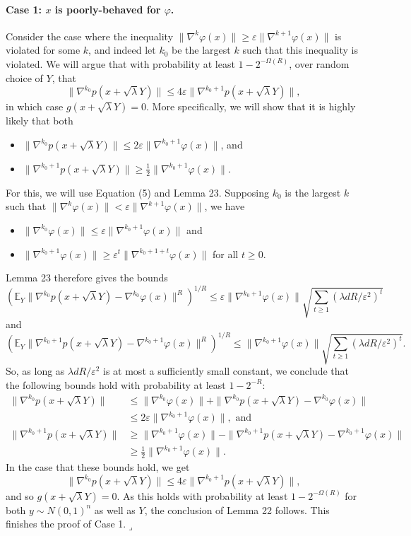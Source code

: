 \paragraph{Case 1: $x$ is poorly-behaved for $\varphi$.} Consider the case where the inequality $\|\nabla^k\varphi(x)\|\geq\varepsilon\|\nabla^{k+1}\varphi(x)\|$ is violated for some $k$, and indeed let $k_0$ be the largest $k$ such that this inequality is violated. We will argue that with probability at least $1-2^{-\Omega(R)}$, over random choice of $Y$, that
\[\|\nabla^{k_0}p(x+\sqrt\lambda Y)\|\leq4\varepsilon\|\nabla^{k_0+1}p(x+\sqrt\lambda Y)\|,\]
in which case $g(x+\sqrt\lambda Y)=0$.
More specifically, we will show that it is highly likely that both
\begin{itemize}
\item $\|\nabla^{k_0}p(x+\sqrt\lambda Y)\|\leq2\varepsilon\|\nabla^{k_0+1}\varphi(x)\|$, and
\item $\|\nabla^{k_0+1}p(x+\sqrt\lambda Y)\|\geq\frac12\|\nabla^{k_0+1}\varphi(x)\|$.
\end{itemize}
For this, we will use Equation (5) and Lemma 23. Supposing $k_0$ is the largest $k$ such that $\|\nabla^k\varphi(x)\|<\varepsilon\|\nabla^{k+1}\varphi(x)\|$, we have
\begin{itemize}
\item $\|\nabla^{k_0}\varphi(x)\|\leq\varepsilon\|\nabla^{k_0+1}\varphi(x)\|$ and
\item $\|\nabla^{k_0+1}\varphi(x)\|\geq\varepsilon^t\|\nabla^{k_0+1+t}\varphi(x)\|$ for all $t\geq0$.
\end{itemize}
Lemma 23 therefore gives the bounds
\[\left(\mathbb E_Y\|\nabla^{k_0}p(x+\sqrt\lambda Y)-\nabla^{k_0}\varphi(x)\|^R\right)^{1/R}\leq\varepsilon\|\nabla^{k_0+1}\varphi(x)\|\sqrt{\sum_{t\geq1}(\lambda dR/\varepsilon^2)^t}\]
and
\[\left(\mathbb E_Y\|\nabla^{k_0+1}p(x+\sqrt\lambda Y)-\nabla^{k_0+1}\varphi(x)\|^R\right)^{1/R}\leq\|\nabla^{k_0+1}\varphi(x)\|\sqrt{\sum_{t\geq1}(\lambda dR/\varepsilon^2)^t}.\]
So, as long as $\lambda dR/\varepsilon^2$ is at most a sufficiently small constant, we conclude that the following bounds hold with probability at least $1-2^{-R}$:
\begin{align*}
\|\nabla^{k_0}p(x+\sqrt\lambda Y)\|&\leq\|\nabla^{k_0}\varphi(x)\|+\|\nabla^{k_0}p(x+\sqrt\lambda Y)-\nabla^{k_0}\varphi(x)\|\\
&\leq2\varepsilon\|\nabla^{k_0+1}\varphi(x)\|,\text{ and}\\
\|\nabla^{k_0+1}p(x+\sqrt\lambda Y)\|&\geq\|\nabla^{k_0+1}\varphi(x)\|-\|\nabla^{k_0+1}p(x+\sqrt\lambda Y)-\nabla^{k_0+1}\varphi(x)\|\\
&\geq\tfrac12\|\nabla^{k_0+1}\varphi(x)\|.
\end{align*}
In the case that these bounds hold, we get
\[\|\nabla^{k_0}p(x+\sqrt\lambda Y)\|\leq4\varepsilon\|\nabla^{k_0+1}p(x+\sqrt\lambda Y)\|,\]
and so $g(x+\sqrt\lambda Y)=0$. As this holds with probability at least $1-2^{-\Omega(R)}$ for both $y\sim N(0,1)^n$ as well as $Y$, the conclusion of Lemma 22 follows. This finishes the proof of Case 1.\hfill$\lrcorner$
